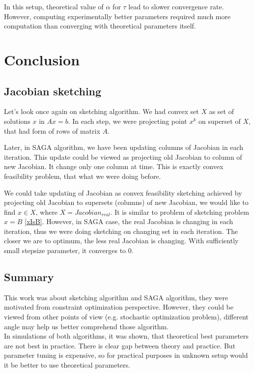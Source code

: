 \documentclass[11pt]{book}
\begin{document}
In this setup, theoretical value of $\alpha$ for $\tau$ lead to slower convergence rate. However, computing experimentally better parameters required much more computation than converging with theoretical parameters itself.

\chapter{Conclusion}

\section{Jacobian sketching}

Let's look once again on sketching algorithm. We had convex set $X$ as set of solutions $x$ in $Ax=b$. In each step, we were projecting point $x^k$ on superset of $X$, that had form of rows of matrix $A$.

Later, in SAGA algorithm, we have been updating columns of Jacobian in each iteration. This update could be viewed as projecting old Jacobian to column of new Jacobian. It change only one column at time. This is exactly convex feasibility problem, that what we were doing before.

We could take updating of Jacobian as convex feasibility sketching achieved by projecting old Jacobian to supersets (columns) of new Jacobian, we would like to find $x \in X$, where $X=Jacobian_{real}$. It is similar to problem of sketching problem $x=B$ \ref{xIsB}. However, in SAGA case, the real Jacobian is changing in each iteration, thus we were doing sketching on changing set in each iteration. The closer we are to optimum, the less real Jacobian is changing. With sufficiently small stepsize parameter, it converges to $0$.


\section{Summary}
This work was about sketching algorithm and SAGA algorithm, they were motivated from constraint optimization perspective. However, they could be viewed from other points of view (e.g. stochastic optimization problem), different angle may help us better comprehend those algorithm.\\

In simulations of both algorithms, it was shown, that theoretical best parameters are not best in practice. There is clear gap between theory and practice. But parameter tuning is expensive, so for practical purposes in unknown setup would it be better to use theoretical parameters.
\end{document}
